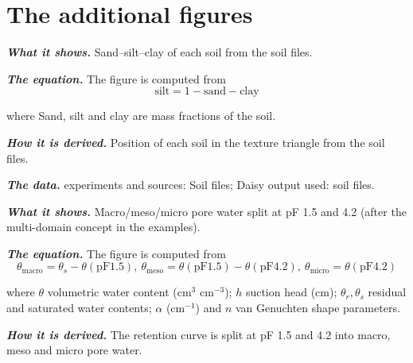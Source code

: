 \section{The additional figures}
\par\vspace{6pt}\noindent{}\par\nobreak
{}\label{fig:a21_1}
\par\noindent\textbf{\color{khmag}\emph{What it shows.}} Sand--silt--clay of each soil from the soil files.
\par\noindent\textbf{\color{khmag}\emph{The equation.}} The figure is computed from
\begin{equation}\boxed{\text{silt}=1-\text{sand}-\text{clay}}\end{equation}
\par\noindent where Sand, silt and clay are mass fractions of the soil.
\par\noindent\textbf{\color{khmag}\emph{How it is derived.}} Position of each soil in the texture triangle from the soil files.
\par\noindent\textbf{\color{khmag}\emph{The data.}} experiments and sources: Soil files; Daisy output used: soil files.
\par\vspace{6pt}\noindent{}\par\nobreak
{}\label{fig:a21_2}
\par\noindent\textbf{\color{khmag}\emph{What it shows.}} Macro/meso/micro pore water split at pF 1.5 and 4.2 (after the multi-domain concept in the examples).
\par\noindent\textbf{\color{khmag}\emph{The equation.}} The figure is computed from
\begin{equation}\boxed{\theta_{\mathrm{macro}}=\theta_s-\theta(\mathrm{pF}1.5),\ \theta_{\mathrm{meso}}=\theta(\mathrm{pF}1.5)-\theta(\mathrm{pF}4.2),\ \theta_{\mathrm{micro}}=\theta(\mathrm{pF}4.2)}\end{equation}
\par\noindent where $\theta$ volumetric water content (cm$^3$ cm$^{-3}$); $h$ suction head (cm); $\theta_r,\theta_s$ residual and saturated water contents; $\alpha$ (cm$^{-1}$) and $n$ van Genuchten shape parameters.
\par\noindent\textbf{\color{khmag}\emph{How it is derived.}} The retention curve is split at pF 1.5 and 4.2 into macro, meso and micro pore water.
